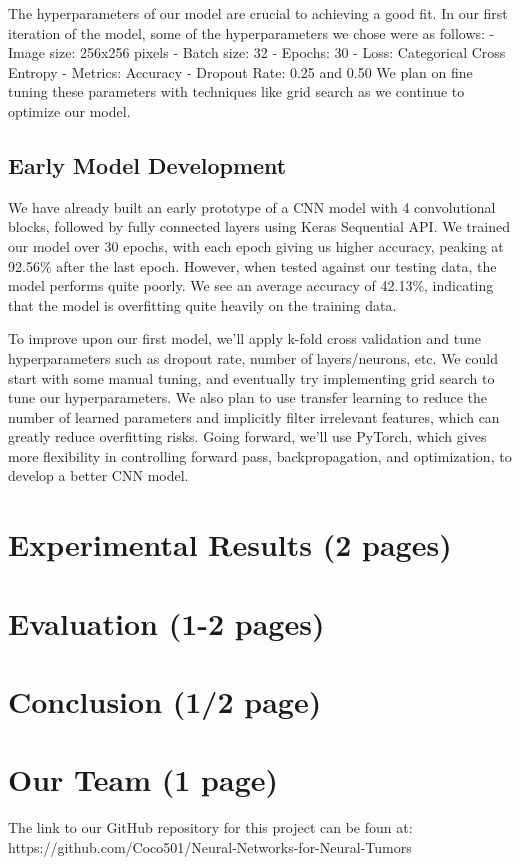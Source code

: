\documentclass[conference]{IEEEtran}
\begin{document}
The hyperparameters of our model are crucial to achieving a good fit. In our first iteration of the model, some of the hyperparameters we chose were as follows:
- Image size: 256x256 pixels		- Batch size: 32		- Epochs: 30	
- Loss:  Categorical Cross Entropy 	- Metrics: Accuracy		- Dropout Rate: 0.25 and 0.50
We plan on fine tuning these parameters with techniques like grid search as we continue to optimize our model. 

\subsection{Early Model Development}

We have already built an early prototype of a CNN model with 4 convolutional blocks, followed by fully connected layers using Keras Sequential API. We trained our model over 30 epochs, with each epoch giving us higher accuracy, peaking at 92.56\% after the last epoch. However, when tested against our testing data, the model performs quite poorly. We see an average accuracy of 42.13\%, indicating that the model is overfitting quite heavily on the training data.

To improve upon our first model, we'll apply k-fold cross validation and tune hyperparameters such as dropout rate, number of layers/neurons, etc. We could start with some manual tuning, and eventually try implementing grid search to tune our hyperparameters. We also plan to use transfer learning to reduce the number of learned parameters and implicitly filter irrelevant features, which can greatly reduce overfitting risks. Going forward, we'll use PyTorch, which gives more flexibility in controlling forward pass, backpropagation, and optimization, to develop a better CNN model.


\section{Experimental Results (2 pages)}

\section{Evaluation (1-2 pages)}

\section{Conclusion (1/2 page)}

\section{Our Team (1 page)}
The link to our GitHub repository for this project can be foun at: https://github.com/Coco501/Neural-Networks-for-Neural-Tumors
\end{document}
